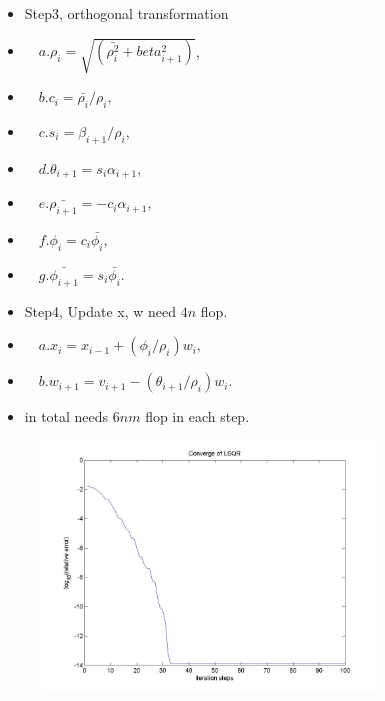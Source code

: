 \documentclass{beamer}
\begin{document}
\begin{frame}
\begin{itemize}
    \item Step3, orthogonal transformation
    \item       $\quad a.\rho_{i}=\sqrt{(\bar{\rho_{i}^2}+beta_{i+1}^2)}$,
    \item       $\quad b.c_{i}=\bar{\rho_{i}}/\rho_{i},$
    \item       $\quad c.s_{i}=\beta_{i+1}/\rho_{i},$
    \item       $\quad d.\theta_{i+1}=s_{i}\alpha_{i+1},$
    \item       $\quad e.\bar{\rho_{i+1}}=-c_{i}\alpha_{i+1},$
    \item       $\quad f.\phi_{i}=c_{i}\bar{\phi_{i}},$
    \item       $\quad g.\bar{\phi_{i+1}}=s_{i}\bar{\phi_{i}}.$
    \item Step4, Update x, w need $4n$ flop.
    \item       $\quad a.x_{i}=x_{i-1}+(\phi_{i}/\rho_{i})w_{i},$
    \item       $\quad b.w_{i+1}=v_{i+1}-(\theta_{i+1}/\rho_{i})w_{i}.$
    \item in total needs $6nm$ flop in each step.
\end{itemize}
\end{frame}

\begin{frame}
    \begin{figure}[htbp]
        \begin{minipage}[b]{0.8\linewidth}
            \includegraphics[width=3.5in]{Images/LSQR}
        \end{minipage}
    \end{figure}
\end{frame}
\end{document}
